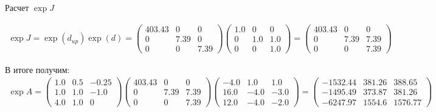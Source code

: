 Расчет $\exp J$

\begin{gather}
    \exp J = \exp(d_{up}) \exp(d) = 
 \begin{pmatrix}
	403.43 & 0 & 0\\ 
	0 & 7.39 & 0\\ 
	0 & 0 & 7.39
\end{pmatrix}
\begin{pmatrix}
	1.0 & 0 & 0\\ 
	0 & 1.0 & 1.0\\ 
	0 & 0 & 1.0
\end{pmatrix} = 
\begin{pmatrix}
	403.43 & 0 & 0\\ 
	0 & 7.39 & 7.39\\ 
	0 & 0 & 7.39
\end{pmatrix}
\end{gather}

В итоге получим:
\begin{gather}
    \exp A = 
    \begin{pmatrix}
        1.0 & 0.5 & -0.25\\ 
        1.0 & 1.0 & -1.0\\ 
        4.0 & 1.0 & 0
    \end{pmatrix}
    \begin{pmatrix}
        403.43 & 0 & 0\\ 
        0 & 7.39 & 7.39\\ 
        0 & 0 & 7.39
    \end{pmatrix}
    \begin{pmatrix}
        -4.0 & 1.0 & 1.0\\ 
        16.0 & -4.0 & -3.0\\ 
        12.0 & -4.0 & -2.0
    \end{pmatrix}
    =
    \begin{pmatrix}
        -1532.44 & 381.26 & 388.65\\ 
        -1495.49 & 373.87 & 381.26\\ 
        -6247.97 & 1554.6 & 1576.77
    \end{pmatrix}
\end{gather}
